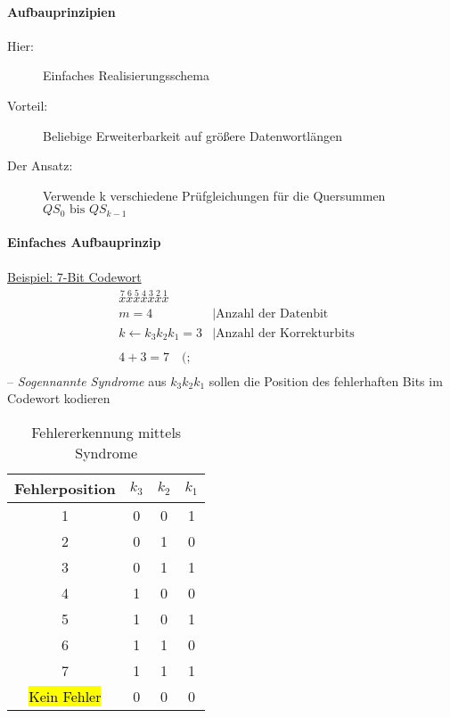 \documentclass[a4paper]{scrartcl}
\begin{document}
					\paragraph{Aufbauprinzipien}
						\begin{description}
							\item[Hier:] Einfaches Realisierungsschema
							\item[Vorteil:] Beliebige Erweiterbarkeit auf größere Datenwortlängen
							\item[Der Ansatz:] Verwende k verschiedene Prüfgleichungen für die Quersummen \( QS_0 \text{ bis } QS_{k-1} \)
						\end{description}
					
					\paragraph{Einfaches Aufbauprinzip}
					\ul{Beispiel: 7-Bit Codewort}  \\
					 \begin{align*}
					 	 &\overset{7}{x} \overset{6}{x} \overset{5}{x} \overset{4}{x} \overset{3}{x} \overset{2}{x} \overset{1}{x}\\
					 	&m = 4 &| \text{Anzahl der Datenbit}\\
					 	&k \gets k_3 k_2 k_1 = 3 &| \text{Anzahl der Korrekturbits} \\
					 	\\
					 	&4 + 3 = 7 \quad (;\\
					 \end{align*}
					 -- \emph{Sogennannte Syndrome} aus \( k_3 k_2 k_1 \) sollen die Position des fehlerhaften Bits im Codewort kodieren\\ 
					
					\begin{table}[h]
						\centering
						\begin{tabular}{c | c c c }
							Fehlerposition	&\(k_3\) &\(k_2\) & \(k_1\) \\ \hline
							1& 0 & 0 &1\\
							2 &0&1&0\\
							3 &0&1&1\\
							4 &1&0&0\\
							5 &1&0&1\\
							6 &1&1&0\\
							7 &1&1&1\\
							\hl{Kein Fehler}&0&0&0
						\end{tabular}
						\caption{Fehlererkennung mittels Syndrome}
					\end{table}
					
\end{document}
